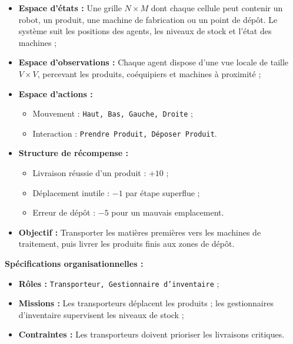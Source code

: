 \documentclass[pdflatex,sn-mathphys-num]{sn-jnl}%
\theoremstyle{thmstyleone}%
\theoremstyle{thmstyletwo}%
\theoremstyle{thmstylethree}%
\begin{document}
\begin{itemize}
    \item \textbf{Espace d'états :} Une grille $N \times M$ dont chaque cellule peut contenir un robot, un produit, une machine de fabrication ou un point de dépôt. Le système suit les positions des agents, les niveaux de stock et l'état des machines ;
    \item \textbf{Espace d'observations :} Chaque agent dispose d'une vue locale de taille $V \times V$, percevant les produits, coéquipiers et machines à proximité ;
    \item \textbf{Espace d'actions :}
          \begin{itemize}
              \item Mouvement : \texttt{Haut, Bas, Gauche, Droite} ;
              \item Interaction : \texttt{Prendre Produit, Déposer Produit}.
          \end{itemize}
    \item \textbf{Structure de récompense :}
          \begin{itemize}
              \item Livraison réussie d'un produit : $+10$ ;
              \item Déplacement inutile : $-1$ par étape superflue ;
              \item Erreur de dépôt : $-5$ pour un mauvais emplacement.
          \end{itemize}
    \item \textbf{Objectif :} Transporter les matières premières vers les machines de traitement, puis livrer les produits finis aux zones de dépôt.
\end{itemize}

\textbf{Spécifications organisationnelles :}
\begin{itemize}
    \item \textbf{Rôles :} \texttt{Transporteur, Gestionnaire d'inventaire} ;
    \item \textbf{Missions :} Les transporteurs déplacent les produits ; les gestionnaires d'inventaire supervisent les niveaux de stock ;
    \item \textbf{Contraintes :} Les transporteurs doivent prioriser les livraisons critiques.
\end{itemize}
\end{document}

